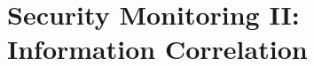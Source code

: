 \documentclass[../main.tex]{subfiles}
\begin{document}
\chapter{Security Monitoring II: Information Correlation}
\label{ch:information-correlation}

\end{document}
